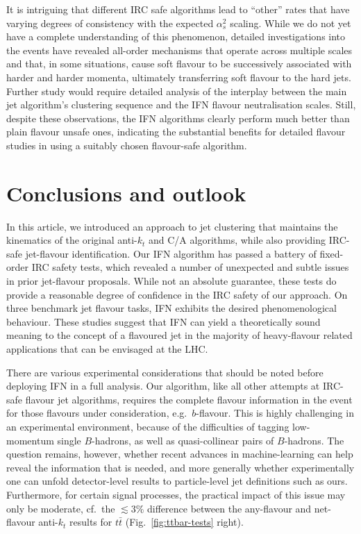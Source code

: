 \documentclass[nofootinbib,twocolumn,preprintnumbers,superscriptaddress,aps]{revtex4-2}
\newcommand{\as}{\alpha_s}
\begin{document}
It is intriguing that different IRC safe algorithms lead to ``other''
rates that have varying degrees of consistency with the expected $\as^2$
scaling.
%
While we do not yet have a complete understanding of this phenomenon,
detailed investigations into the events have revealed all-order
mechanisms that operate across multiple scales and that, in some
situations, cause soft flavour to be successively associated with
harder and harder momenta, ultimately transferring soft flavour to the
hard jets.
%
Further study would require detailed analysis of the interplay between
the main jet algorithm's clustering sequence and the IFN flavour
neutralisation scales.
%
Still, despite these observations, the IFN algorithms clearly perform
much better than plain flavour unsafe ones, indicating the substantial
benefits for detailed flavour studies in using a suitably chosen
flavour-safe algorithm.


\section{Conclusions and outlook}
\label{sec:conclusions}

In this article, we introduced an approach to jet clustering that
maintains the kinematics of the original anti-$k_t$ and C/A
algorithms, while also providing IRC-safe jet-flavour identification.
%
Our IFN algorithm has passed a battery of fixed-order IRC safety
tests, which revealed a number of unexpected and subtle issues in
prior jet-flavour proposals.
%
While not an absolute guarantee, these tests do provide a
  reasonable degree of confidence in the IRC safety of our
  approach.
% 
On three benchmark jet flavour tasks, IFN exhibits the desired phenomenological behaviour.
%
These studies suggest that IFN can yield a theoretically sound
meaning to the concept of a flavoured jet in the majority of
heavy-flavour related applications that can be envisaged at the LHC.


There are various experimental considerations that should be noted before deploying IFN in a full analysis.
%
Our algorithm, like all other attempts at IRC-safe flavour jet
algorithms, requires the complete flavour information in the event for
those flavours under consideration, e.g.\ $b$-flavour.
%
This is highly challenging in an experimental environment, because of
the difficulties of tagging low-momentum single $B$-hadrons, as well
as quasi-collinear pairs of $B$-hadrons.
%
The question remains, however, whether recent advances in
machine-learning can help reveal the information that is needed, and
more generally whether experimentally one can unfold detector-level
results to particle-level jet definitions such as ours.
%
Furthermore, for certain signal processes, the practical impact of
this issue may only be moderate, cf.\ the $\lesssim 3\%$ difference
between the any-flavour and net-flavour anti-$k_t$ results for $t\bar
t$ (Fig.~\ref{fig:ttbar-tests} right).
\end{document}
